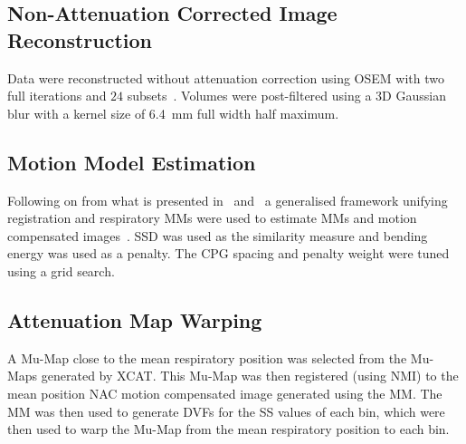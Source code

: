             \subsection{Non-Attenuation Corrected Image Reconstruction} \label{sec:pet_ct_respiratory_motion_correction_with_a_single_attenuation_map_using_nAC_derived_deformation_fields_methods_non-attenuation_corrected_image_reconstruction}
                Data were reconstructed without attenuation correction using \gls{OSEM} with two full iterations and $24$ subsets~\parencite{Hudson1994}.
                Volumes were post-filtered using a \gls{3D} Gaussian blur with a kernel size of \SI{6.4}{\milli\metre} full width half maximum.
            
            \subsection{Motion Model Estimation} \label{sec:pet_ct_respiratory_motion_correction_with_a_single_attenuation_map_using_nAC_derived_deformation_fields_methods_motion_model_estimation}
                Following on from what is presented in~ and~ a generalised framework unifying registration and respiratory \glspl{MM} were used to estimate \glspl{MM} and motion compensated images~\parencite{McClelland2017}. \gls{SSD} was used as the similarity measure and bending energy was used as a penalty. The \gls{CPG} spacing and penalty weight were tuned using a grid search.
            
            \subsection{Attenuation Map Warping} \label{sec:pet_ct_respiratory_motion_correction_with_a_single_attenuation_map_using_nAC_derived_deformation_fields_methods_attenuation_map_warping}
                A \gls{Mu-Map} close to the mean respiratory position was selected from the \glspl{Mu-Map} generated by \gls{XCAT}. This \gls{Mu-Map} was then registered (using \gls{NMI}) to the mean position \gls{NAC} motion compensated image generated using the \gls{MM}. The \gls{MM} was then used to generate \glspl{DVF} for the \gls{SS} values of each bin, which were then used to warp the \gls{Mu-Map} from the mean respiratory position to each bin.
            
